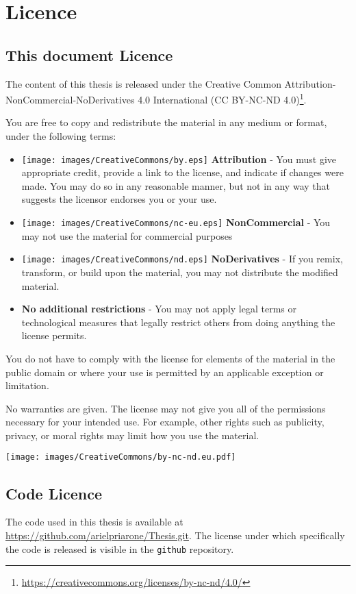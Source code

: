 \section{Licence}
\label{sec:licence}

\subsection{This document Licence}
The content of this thesis is released under the Creative Common Attribution-NonCommercial-NoDerivatives 4.0 International ({CC BY-NC-ND 4.0})\footnote{\url{https://creativecommons.org/licenses/by-nc-nd/4.0/}}. 

You are free to copy and redistribute the material in any medium or format, under the following terms:
\begin{itemize}
    \item \texttt{[image: images/CreativeCommons/by.eps]}\textbf{ Attribution} - You must give appropriate credit, provide a link to the license, and indicate if changes were made. You may do so in any reasonable manner, but not in any way that suggests the licensor endorses you or your use.
    \item \texttt{[image: images/CreativeCommons/nc-eu.eps]}\textbf{ NonCommercial} - You may not use the material for commercial purposes 
    \item \texttt{[image: images/CreativeCommons/nd.eps]}\textbf{ NoDerivatives} - If you remix, transform, or build upon the material, you may not distribute the modified material.
    \item \textbf{No additional restrictions} - You may not apply legal terms or technological measures that legally restrict others from doing anything the license permits.
\end{itemize}

You do not have to comply with the license for elements of the material in the public domain or where your use is permitted by an applicable exception or limitation.

No warranties are given. The license may not give you all of the permissions necessary for your intended use. For example, other rights such as publicity, privacy, or moral rights may limit how you use the material.

\begin{figure*}
    \centering
    \texttt{[image: images/CreativeCommons/by-nc-nd.eu.pdf]}
\end{figure*}

\subsection{Code Licence}
The code used in this thesis is available at \url{https://github.com/arielpriarone/Thesis.git}. The license under which specifically the code is released is visible in the \texttt{github} repository.